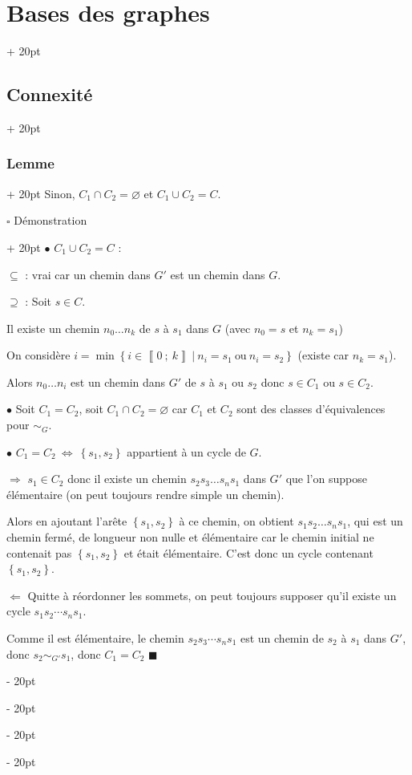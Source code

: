 \documentclass[a4paper, 12pt, twoside]{article}
\newcommand{\nset}[2]{\left\llbracket #1\ ;\ #2 \right\rrbracket}
\newcommand{\set}[1]{\left\{ #1 \right\}}
\newcommand{\ssi}{\ \Leftrightarrow \ }
\newcommand{\ind}[1][20pt]{\advance\leftskip + #1}
\newcommand{\deind}[1][20pt]{\advance\leftskip - #1}
\newenvironment{indt}[2][20pt]{#2 \par \ind[#1]}{\par \deind} %
\begin{document}
\begin{indt}{\section{Bases des graphes}}
\begin{indt}{\subsection{Connexité}}
\begin{indt}{\subsubsection{Lemme}}
                Sinon, $C_1 \cap C_2 = \varnothing$ et $C_1 \cup C_2 = C$.

                \vspace{12pt}
                
                \begin{indt}{$\square$ Démonstration}
                    $\bullet$ $C_1 \cup C_2 = C$ :

                    $\boxed \subseteq$ : vrai car un chemin dans $G'$ est un chemin dans $G$.

                    $\boxed \supseteq$ : Soit $s \in C$.

                    Il existe un chemin $n_0 \ldots n_k$ de $s$ à $s_1$ dans $G$ (avec $n_0 = s$ et $n_k = s_1$)

                    On considère $i = \min\set{i \in \nset 0 k\ |\ n_i = s_1\ \text{ou}\ n_i = s_2}$ (existe car $n_k = s_1$).

                    Alors $n_0 \ldots n_i$ est un chemin dans $G'$ de $s$ à $s_1$ ou $s_2$ donc $s \in C_1$ ou $s \in C_2$.

                    \vspace{12pt}
                    
                    $\bullet$ Soit $C_1 = C_2$, soit $C_1 \cap C_2 = \varnothing$ car $C_1$ et $C_2$ sont des classes d'équivalences pour $\sim_G$.

                    \vspace{12pt}
                    
                    $\bullet$ $C_1 = C_2 \ssi \set{s_1, s_2}$ appartient à un cycle de $G$.

                    $\boxed \Rightarrow$ $s_1 \in C_2$ donc il existe un chemin $s_2 s_3 \ldots s_n s_1$ dans $G'$ que l'on suppose élémentaire (on peut toujours rendre simple un chemin).

                    Alors en ajoutant l'arête $\set{s_1, s_2}$ à ce chemin, on obtient $s_1 s_2 \ldots s_n s_1$, qui est un chemin fermé, de longueur non nulle et élémentaire car le chemin initial ne contenait pas $\set{s_1, s_2}$ et était élémentaire. C'est donc un cycle contenant $\set{s_1, s_2}$.

                    $\boxed \Leftarrow$ Quitte à réordonner les sommets, on peut toujours supposer qu'il existe un cycle $s_1 s_2 \cdots s_n s_1$.

                    Comme il est élémentaire, le chemin $s_2 s_3 \cdots s_n s_1$ est un chemin de $s_2$ à $s_1$ dans $G'$, donc $s_2 \sim_{G'} s_1$, donc $C_1 = C_2$ $\blacksquare$
                \end{indt}
            \end{indt}


\end{indt}
\end{indt}
\end{document}
